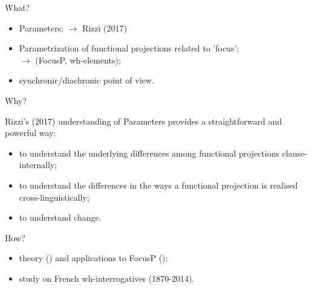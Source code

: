 \documentclass[lesson_slides]{subfiles}
\begin{document}
\begin{frame}[c]{What?}

    \begin{itemize}
        \item[\ding{227}] Parameters; \pause $\longrightarrow$ Rizzi (2017) \pause
        \item[\ding{227}] Parametrization of functional projections related to 'focus';\\ \pause
        $\longrightarrow$ (FocusP, wh-elements); \pause
        \item[\ding{227}] synchronic/diachronic point of view.
    \end{itemize}
    
\end{frame}
\begin{frame}[c]{Why?}

    Rizzi's (2017) understanding of Parameters provides a straightforward and powerful way: \pause
    \begin{itemize}
        \item[\ding{227}] to understand the underlying differences among functional projections clause-internally; \pause 
        \item[\ding{227}] to understand the differences in the ways a functional projection is realised cross-linguistically;
        \item[\ding{227}] to understand change.
    \end{itemize}
  
\end{frame}
\begin{frame}[c]{How?}

    \begin{itemize}
        \item[\ding{227}] theory (\cite{rizzi1997fine}) and applications to FocusP (\cite{samo2019cartography}); \pause 
        \item[\ding{227}] study on French wh-interrogatives \pause (1870-2014).
    \end{itemize}
\end{frame}
\end{document}
